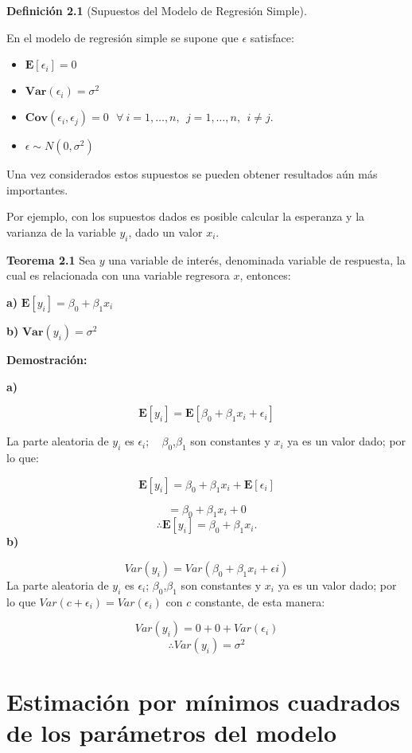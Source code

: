 \documentclass[
  a4paper,
  oneside,
  openany]{book}
\begin{document}
\textbf{Definición 2.1} (Supuestos del Modelo de Regresión Simple).

En el modelo de regresión simple se supone que \(\epsilon\) satisface:

\begin{itemize}
\item
  \(\mathbf{E}[\epsilon_{i}]=0\)
\item
  \(\textbf{Var}(\epsilon_{i})=\sigma^2\)
\item
  \(\textbf{Cov}(\epsilon_{i},\epsilon_{j})= 0 \  \ \ \forall \ i = 1, \ldots, n, \ \  j=1, \ldots, n, \ \  i \neq j.\)
\item
  \(\epsilon \sim N(0,\sigma^2)\)
\end{itemize}

Una vez considerados estos supuestos se pueden obtener resultados aún más importantes.

Por ejemplo, con los supuestos dados es posible calcular la esperanza y la varianza de la variable \(y_{i}\), dado un valor \(x_{i}\).

\textbf{Teorema 2.1} Sea \(y\) una variable de interés, denominada variable de respuesta, la cual es relacionada con una variable regresora \(x\), entonces:

\textbf{a)} \(\mathbf{E}[y_{i}]=\beta_{0}+\beta_{1}x_{i}\)

\textbf{b)} \(\textbf{Var}(y_{i})=\sigma^2\)

\textbf{Demostración:}

\textbf{a)}

\[\mathbf{E}[y_{i}]=\mathbf{E}[\beta_{0}+\beta_{1}x_{i}+\epsilon_{i}]\]

La parte aleatoria de \(y_{i}\) es \(\epsilon_{i}\); ~ \(\beta_{0}\),\(\beta_{1}\) son constantes y \(x_{i}\) ya es un valor dado; por lo que:

\[\mathbf{E}[y_{i}]=\beta_{0}+\beta_{1}x_{i}+\mathbf{E}[\epsilon_{i}]\]

\[=\beta_{0}+\beta_{1}x_{i}+0\]
\[\therefore \mathbf{E}[y_{i}]=\beta_{0}+\beta_{1}x_{i}.\]
\textbf{b)}

\[Var(y_{i})= Var(\beta_{0}+\beta_{1}x_{i}+\epsilon{i})\]
La parte aleatoria de \(y_{i}\) es \(\epsilon_{i}\); \(\beta_{0}\),\(\beta_{1}\) son constantes y \(x_{i}\) ya es un valor dado; por lo que \(Var(c+\epsilon_{i})=Var(\epsilon_{i})\) con \(c\) constante, de esta manera:

\[Var(y_{i})=0+0+Var(\epsilon_{i})\]
\[\therefore Var(y_{i})=\sigma^2\]

\hypertarget{estimaciuxf3n-por-muxednimos-cuadrados-de-los-paruxe1metros-del-modelo}{%
\section{Estimación por mínimos cuadrados de los parámetros del modelo}\label{estimaciuxf3n-por-muxednimos-cuadrados-de-los-paruxe1metros-del-modelo}}
\end{document}
